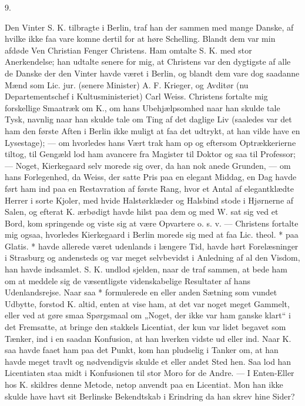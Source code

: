 \documentclass[12pt,a4paper,openany]{book}
\newcommand{\secnum}[1]{\par\begin{center}#1\end{center}\par\nobreak}
\newcommand{\opage}[1]{\marginnote{\footnotesize\textit{[#1]}}}
\begin{document}
\secnum{9.}

Den Vinter S. K. tilbragte i Berlin, traf han der
sammen med mange Danske, af hvilke ikke faa vare
komne dertil for at høre Schelling. Blandt dem var
min afdøde Ven Christian Fenger Christens. Ham omtalte
S. K. med stor Anerkendelse; han udtalte senere
for mig, at Christens var den dygtigste af alle de Danske
der den Vinter havde været i Berlin, og blandt dem
vare dog saadanne Mænd som Lic. jur. (senere Minister)
A. F. Krieger, og Avditør (nu Departementschef i Kultusministeriet)
Carl Weiss. Christens fortalte mig forskellige
Smaatræk om K., om hans Ubehjælpsomhed naar han
skulde tale Tysk, navnlig naar han skulde tale om Ting
af det daglige Liv (saaledes var det ham den første
Aften i Berlin ikke muligt at faa det udtrykt, at han
vilde have en Lysestage); --- om hvorledes hans Vært
trak ham op og eftersom Optrækkerierne tiltog, til Gengæld
lod ham avancere fra Magister til Doktor og saa
til Professor; --- Noget, Kierkegaard selv morede sig
over, da han nok anede Grunden, --- om hans Forlegenhed,
da Weiss, der satte Pris paa en elegant Middag, en Dag
havde ført ham ind paa en Restavration af første Rang,
hvor et Antal af elegantklædte Herrer i sorte Kjoler,
med hvide Halstørklæder og Halsbind stode i Hjørnerne
af Salen, og efterat K. ærbødigt havde hilst paa dem
\opage{345}og med W. sat sig ved et Bord, kom springende og viste
sig at være Opvartere o. s. v. --- Christens fortalte mig
ogsaa, hvorledes Kierkegaard i Berlin morede sig med
at faa Lic. theol. * paa Glatis. * havde allerede været
udenlands i længere Tid, havde hørt Forelæsninger i
Strasburg og andensteds og var meget selvbevidst i
Anledning af al den Visdom, han havde indsamlet. S. K.
undlod sjelden, naar de traf sammen, at bede ham om
at meddele sig de væsentligste videnskabelige Resultater
af hans Udenlandsrejse. Naar saa * formulerede en eller
anden Sætning som vundet Udbytte, forstod K. altid,
enten at vise ham, at det var noget meget Gammelt,
eller ved at gøre smaa Spørgsmaal om „Noget, der ikke
var ham ganske klart“ i det Fremsatte, at bringe den
stakkels Licentiat, der kun var lidet begavet som Tænker,
ind i en saadan Konfusion, at han hverken vidste ud
eller ind. Naar K. saa havde faaet ham paa det Punkt,
kom han pludselig i Tanker om, at han havde meget
travlt og nødvendigvis skulde et eller andet Sted hen.
Saa lod han Licentiaten staa midt i Konfusionen til stor
Moro for de Andre. --- I Enten-Eller hos K. skildres
denne Metode, netop anvendt paa en Licentiat. Mon
han ikke skulde have havt sit Berlinske Bekendtskab i
Erindring da han skrev hine Sider?
\end{document}
